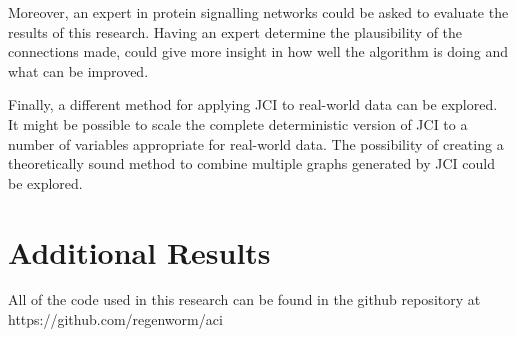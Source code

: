 \documentclass[a4paper,pdf]{article}
\begin{document}
Moreover, an expert in protein signalling networks could be asked to evaluate the results of this research. Having an expert determine the plausibility of the connections made, could give more insight in how well the algorithm is doing and what can be improved. 

Finally, a different method for applying JCI to real-world data can be explored. It might be possible to scale the complete deterministic version of JCI to a number of variables appropriate for real-world data. The possibility of creating a theoretically sound method to combine multiple graphs generated by JCI could be explored.  


 

\newpage
\appendix
\section{Additional Results}
All of the code used in this research can be found in the github repository at https://github.com/regenworm/aci
\end{document}
